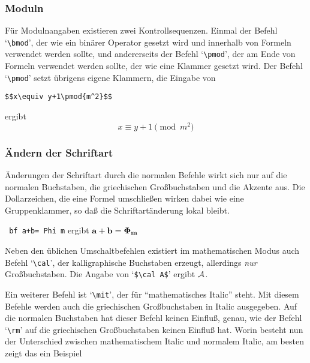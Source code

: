 \subsubsection{Moduln}
F\"ur Modulnangaben existieren zwei 
Kontrollsequenzen. Einmal der Befehl
`\verb|\bmod|', der wie ein bin\"arer
Operator gesetzt wird und
innerhalb von Formeln verwendet werden sollte, und andererseits der
Befehl 
`\verb|\pmod|', der am Ende von Formeln verwendet werden
sollte, der wie eine 
Klammer gesetzt wird. Der Befehl `\verb|\pmod|'
setzt \"ubrigens eigene Klammern, die Eingabe von
\begin{verbatim}
$$x\equiv y+1\pmod{m^2}$$
\end{verbatim}
ergibt
$$x\equiv y+1\pmod{m^2}$$
\subsubsection{\"Andern der Schriftart}
\"Anderungen der Schriftart durch die normalen Befehle wirkt sich nur
auf die normalen Buchstaben, die 
griechischen Gro\ss{}buchstaben und die
Akzente aus. Die 
Dollarzeichen, die eine Formel umschlie\ss{}en wirken
dabei wie eine 
Gruppenklammer, so da\ss{} die Schriftart\"anderung lokal bleibt.

{\tt{} bf a+b= Phi m} ergibt $\bf
a+b=\Phi_m$

Neben den \"ublichen Umschaltbefehlen existiert im mathematischen Modus
auch Befehl
`\verb|\cal|', der 
kalligraphische Buchstaben erzeugt,
allerdings {\em nur} 
Gro\ss{}buchstaben. Die Angabe von `\verb|$\cal A$|'
ergibt $\cal A$.

Ein weiterer Befehl ist 
`\verb|\mit|', der f\"ur ``mathematisches
Italic'' steht. Mit diesem Befehle werden auch die griechischen
Gro\ss{}buchstaben in Italic ausgegeben. Auf die normalen Buchstaben hat
dieser Befehl keinen Einflu\ss{}, genau, wie der Befehl
`\verb|\rm|' auf
die griechischen Gro\ss{}buchstaben keinen Einflu\ss{} hat. Worin besteht nun
der Unterschied zwischen mathematischem Italic und normalem Italic, am
besten zeigt das ein Beispiel

